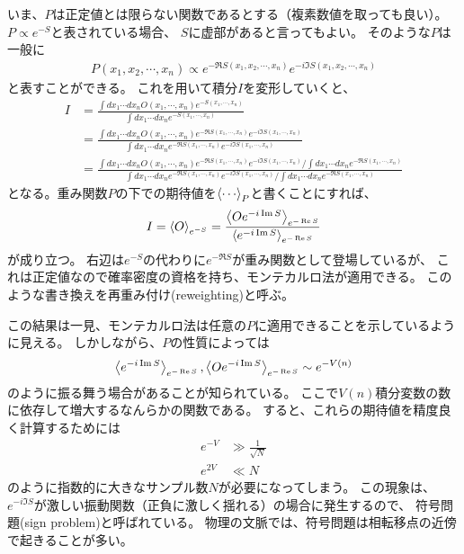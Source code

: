 \documentclass[]{ltjsarticle}
\begin{document}
いま、$P$は正定値とは限らない関数であるとする（複素数値を取っても良い）。
$P \propto e^{-S}$と表されている場合、
$S$に虚部があると言ってもよい。
そのような$P$は一般に
\begin{align}
    P(x_1, x_2, \cdots, x_n)
    \propto 
    e^{-\Re S(x_1, x_2, \cdots, x_n)}
    e^{- i\Im S(x_1, x_2, \cdots, x_n)}
\end{align}
と表すことができる。
これを用いて積分$I$を変形していくと、
\begin{align}
    I 
    &=
    \frac{
        \int dx_1 \cdots dx_n 
        O(x_1,\cdots,x_n)     
        e^{-S(x_1, \cdots, x_n)}    
    }{
        \int dx_1 \cdots dx_n 
        e^{-S(x_1, \cdots, x_n)}    
    } 
    \\
    &= 
    \frac{
        \int dx_1 \cdots dx_n 
        O(x_1,\cdots,x_n)     
        e^{-\Re S(x_1, \cdots, x_n)}
        e^{- i\Im S(x_1, \cdots, x_n)}
    }{
        \int dx_1 \cdots dx_n 
        e^{-\Re S(x_1, \cdots, x_n)}
        e^{- i\Im S(x_1, \cdots, x_n)}
    } \\
    &= 
    \frac{
        \int dx_1 \cdots dx_n 
        O(x_1, \cdots,x_n)     
        e^{-\Re S(x_1, \cdots, x_n)}
        e^{- i\Im S(x_1, \cdots, x_n)}   
        / 
        \int dx_1 \cdots dx_n 
        e^{-\Re S(x_1, \cdots, x_n)}
    }{
        \int dx_1 \cdots dx_n 
        e^{-\Re S(x_1, \cdots, x_n)}
        e^{- i\Im S(x_1, \cdots, x_n)}    
        /
        \int dx_1 \cdots dx_n 
        e^{-\Re S(x_1, \cdots, x_n)}
    }
\end{align}
となる。重み関数$P$の下での期待値を$\expval{\cdots}_P$と書くことにすれば、
\begin{align}
    I 
    = 
    \expval{O}_{e^{-S}}
    =
    \frac{\expval{O e^{-i\Im S}}_{e^{-\Re  S}}}{\expval{e^{-i\Im S}}_{e^{-\Re S}}}
\end{align}
が成り立つ。
右辺は$e^{-S}$の代わりに$e^{-\Re S}$が重み関数として登場しているが、
これは正定値なので確率密度の資格を持ち、モンテカルロ法が適用できる。
このような書き換えを再重み付け(reweighting)と呼ぶ。

この結果は一見、モンテカルロ法は任意の$P$に適用できることを示しているように見える。
しかしながら、$P$の性質によっては
\begin{align}
    \expval{e^{-i\Im S}}_{e^{-\Re S}}, 
    \expval{O e^{-i\Im S}}_{e^{-\Re  S}}
    \sim 
    e^{-V(n)}
\end{align}
のように振る舞う場合があることが知られている。
ここで$V(n)$積分変数の数に依存して増大するなんらかの関数である。
すると、これらの期待値を精度良く計算するためには
\begin{align}
    e^{-V} &\gg \frac{1}{\sqrt{N}} \\
    e^{2V} &\ll N
\end{align}
のように指数的に大きなサンプル数$N$が必要になってしまう。
この現象は、$e^{-i\Im S}$が激しい振動関数（正負に激しく揺れる）の場合に発生するので、
符号問題(sign problem)と呼ばれている。
物理の文脈では、符号問題は相転移点の近傍で起きることが多い。
\end{document}
